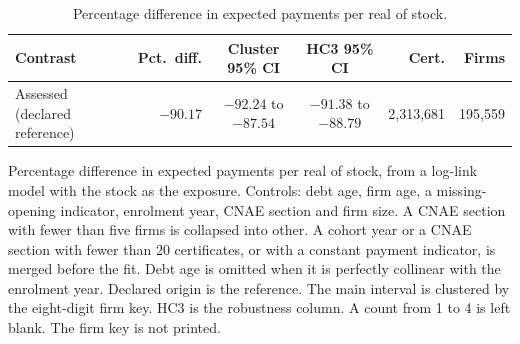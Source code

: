 \begin{table}[H]
\centering
\caption{Percentage difference in expected payments per real of stock.}\label{tab:recovery-pct}
\footnotesize
\begin{tabular}{@{}l r cc rr@{}}
\toprule
Contrast & Pct.\ diff. & Cluster 95\% CI & HC3 95\% CI & Cert. & Firms \\
\midrule
Assessed (declared reference) & $-90.17$ & $-92.24$ to $-87.54$ & $-91.38$ to $-88.79$ & 2,313,681 & 195,559 \\
\bottomrule
\end{tabular}

\vspace{0.4em}
\begin{minipage}{0.95\textwidth}
\footnotesize
Percentage difference in expected payments per real of stock, from a log-link model with the stock as the exposure. Controls: debt age, firm age, a missing-opening indicator, enrolment year, CNAE section and firm size. A CNAE section with fewer than five firms is collapsed into other. A cohort year or a CNAE section with fewer than 20 certificates, or with a constant payment indicator, is merged before the fit. Debt age is omitted when it is perfectly collinear with the enrolment year. Declared origin is the reference. The main interval is clustered by the eight-digit firm key. HC3 is the robustness column. A count from 1 to 4 is left blank. The firm key is not printed.
\end{minipage}
\end{table}
